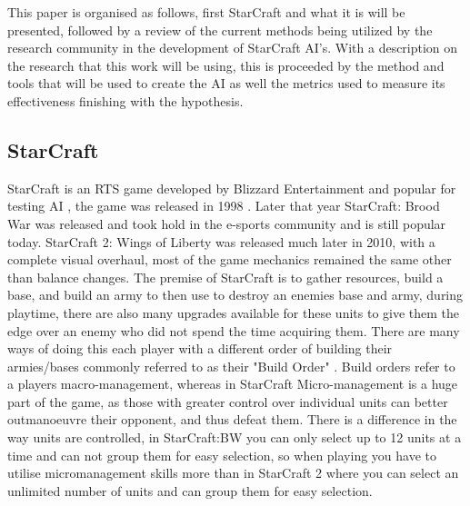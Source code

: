 \documentclass[journal]{IEEEtran}
\begin{document}
This paper is organised as follows, first StarCraft and what it is will be presented, followed by a review of the current methods being utilized by the research community in the development of StarCraft AI's. With a description on the research that this work will be using, this is proceeded by the method and tools that will be used to create the AI as well the metrics used to measure its effectiveness finishing with the hypothesis.

\subsection{StarCraft}
StarCraft is an RTS game developed by Blizzard Entertainment \cite{Blizzard} and popular for testing AI \cite{Current}, the game was released in 1998 \cite{Release}. Later that year StarCraft: Brood War was released and took hold in the e-sports community and is still popular today. StarCraft 2: Wings of Liberty was released much later in 2010, with a complete visual overhaul, most of the game mechanics remained the same other than balance changes. The premise of StarCraft is to gather resources, build a base, and build an army to then use to destroy an enemies base and army, during playtime, there are also many upgrades available for these units to give them the edge over an enemy who did not spend the time acquiring them. There are many ways of doing this each player with a different order of building their armies/bases commonly referred to as their "Build Order" \cite{BuildOrder}. Build orders refer to a players macro-management, whereas in StarCraft Micro-management is a huge part of the game, as those with greater control over individual units can better outmanoeuvre their opponent, and thus defeat them. There is a difference in the way units are controlled, in StarCraft:BW you can only select up to 12 units at a time and can not group them for easy selection, so when playing you have to utilise micromanagement skills more than in StarCraft 2 where you can select an unlimited number of units and can group them for easy selection.
\end{document}
